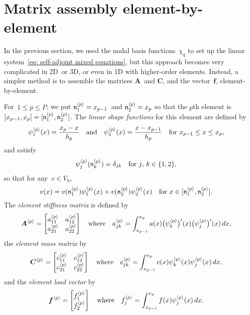 \section{Matrix assembly element-by-element}\label{sec: matrix assembly 1d}

In the previous section, we used the nodal basis functions~$\chi_q$ to set up 
the linear system~\eqref{eq: self-adjoint mixed equations}, but this approach 
becomes very complicated in 2D~or 3D, or even in 1D with higher-order elements.
Instead, a simpler method is to assemble the matrices $\boldsymbol{A}$~and 
$\boldsymbol{C}$, and the vector~$\boldsymbol{f}$, element-by-element.  

For~$1\le p\le P$, we put $\mathsf{n}^{\langle p\rangle}_1=x_{p-1}$~and
$\mathsf{n}^{\langle p\rangle}_2=x_p$ so that the $p$th 
element is $[x_{p-1},x_p]=[\mathsf{n}^{\langle p\rangle}_1,\mathsf{n}^{\langle p\rangle}_2]$.  The
\emph{linear shape functions} for this element are defined by
\[
\psi^{\langle p\rangle}_1(x)=\frac{x_p-x}{h_p}
\quad\text{and}\quad
\psi^{\langle p\rangle}_2(x)=\frac{x-x_{p-1}}{h_p}
\quad\text{for $x_{p-1}\le x\le x_p$,}
\]
and satisfy
\[
\psi^{\langle p\rangle}_j(\mathsf{n}^{\langle p\rangle}_k)=\delta_{jk}
    \quad\text{for $j$, $k\in\{1,2\}$,}
\]
so that for any~$v\in V_h$,
\[
v(x)=v(\mathsf{n}^{\langle p\rangle}_1)\psi^{\langle p\rangle}_1(x)
    +v(\mathsf{n}^{\langle p\rangle}_2)\psi^{\langle p\rangle}_2(x)
    \quad\text{for $x\in[\mathsf{n}^{\langle p\rangle}_1,\mathsf{n}^{\langle p\rangle}_2]$.}
\]
The \emph{element stiffness matrix} is defined by
\[
\boldsymbol{A}^{\langle p\rangle}=\begin{bmatrix}
a^{\langle p\rangle}_{11}&a^{\langle p\rangle}_{12}\\
a^{\langle p\rangle}_{21}&a^{\langle p\rangle}_{22}\end{bmatrix}
\quad\text{where}\quad
a^{\langle p\rangle}_{jk}=\int_{x_{p-1}}^{x_p}a(x)\bigl(\psi_k^{\langle p\rangle}\bigr)'(x)
    \bigl(\psi_j^{\langle p\rangle}\bigr)'(x)\,dx,
\]
the \emph{element mass matrix} by
\[
\boldsymbol{C}^{\langle p\rangle}=\begin{bmatrix}
c^{\langle p\rangle}_{11}&c^{\langle p\rangle}_{12}\\
c^{\langle p\rangle}_{21}&c^{\langle p\rangle}_{22}\end{bmatrix}
\quad\text{where}\quad
c^{\langle p\rangle}_{jk}=\int_{x_{p-1}}^{x_p}c(x)\psi_k^{\langle p\rangle}(x) 
    \psi_j^{\langle p\rangle}(x)\,dx,
\]
and the \emph{element load vector} by
\[
\boldsymbol{f}^{\langle p\rangle}=\begin{bmatrix}f^{\langle p\rangle}_1\\ f^{\langle p\rangle}_2\end{bmatrix}
\quad\text{where}\quad
f^{\langle p\rangle}_j=\int_{x_{p-1}}^{x_p}f(x)\psi_j^{\langle p\rangle}(x)\,dx.
\]

